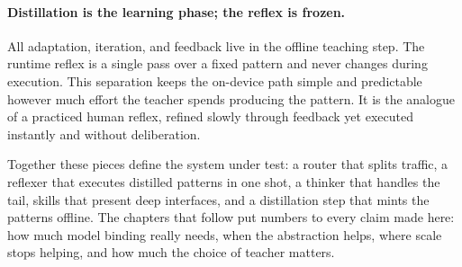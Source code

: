\paragraph{Distillation is the learning phase; the reflex is frozen.} All
adaptation, iteration, and feedback live in the offline teaching step. The
runtime reflex is a single pass over a fixed pattern and never changes during
execution. This separation keeps the on-device path simple and predictable
however much effort the teacher spends producing the pattern. It is the analogue
of a practiced human reflex, refined slowly through feedback yet executed
instantly and without deliberation.

\bigskip
\noindent
Together these pieces define the system under test: a router that splits traffic,
a reflexer that executes distilled patterns in one shot, a thinker that handles
the tail, skills that present deep interfaces, and a distillation step that mints
the patterns offline. The chapters that follow put numbers to every claim made
here: how much model binding really needs, when the abstraction helps, where
scale stops helping, and how much the choice of teacher matters.

